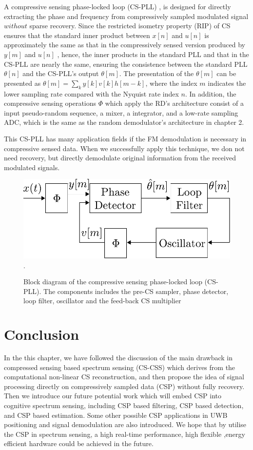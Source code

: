 A compressive sensing phase-locked loop (CS-PLL) \cite{schnelle2012compressive}, is designed for directly extracting the phase and frequency from compressively sampled modulated signal $without$ sparse recovery. Since the restricted isometry property (RIP) of CS ensures that the standard inner product between $x[n]$ and $u[n]$ is approximately the same as that in the compressively sensed version produced by $y[m]$ and $u[n]$ \cite{davenport2010signal}, hence, the inner products in the standard PLL and that in the CS-PLL are nearly the same, ensuring the consistence between the standard PLL $\theta [n]$ and the CS-PLL's output $\theta [m]$. The presentation of the $\theta [m]$ can be presented as $\theta [m] = \sum_{k} y[k]v[k]h[m-k]$, where the index $m$ indicates the lower sampling rate compared with the Nyquist rate index $n$. In addition, the compressive sensing operations $\Phi$ which apply the RD's architecture consist of a input pseudo-random sequence, a mixer, a integrator, and a low-rate sampling ADC, which is the same as the random demodulator's architecture in chapter 2.

This CS-PLL has many application fields if the FM demodulation is necessary in compressive sensed data. When we successfully apply this technique, we don not need recovery, but directly demodulate original information from the received modulated signals.

\begin{figure}[!t]
\centering
\includegraphics[width=0.5\columnwidth]{figs/pll2.pdf}
\DeclareGraphicsExtensions.
\caption{Block diagram of the compressive sensing phase-locked loop (CS-PLL). The components includes the pre-CS sampler, phase detector, loop filter, oscillator and the feed-back CS multiplier}\label{CS-PLL}
\end{figure}

\section{Conclusion}

In the this chapter, we have followed the discussion of the main drawback in compressed sensing based spectrum sensing (CS-CSS) which derives from the computational non-linear CS reconstruction, and then propose the idea of signal processing directly on compressively sampled data (CSP) without fully recovery. Then we introduce our future potential work which will embed CSP into cognitive spectrum sensing, including CSP based filtering, CSP based detection, and CSP based estimation. Some other possible CSP applications in UWB positioning and signal demodulation are also introduced. We hope that by utilise the CSP in spectrum sensing, a high real-time performance, high flexible ,energy efficient hardware could be achieved in the future. 

